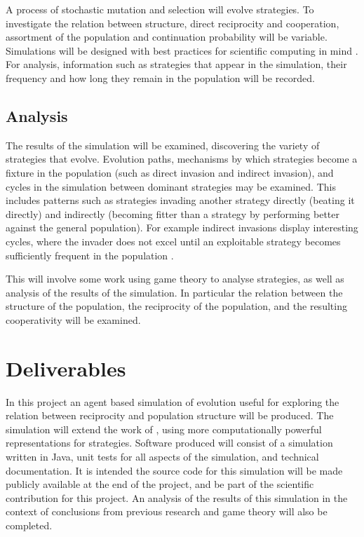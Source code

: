 \documentclass[a4paper,11pt]{article}
\begin{document}
A process of stochastic mutation and selection will evolve strategies. 
To investigate the relation between structure, direct reciprocity and cooperation, assortment of the population and continuation probability will be variable. 
Simulations will be designed with best practices for scientific computing in mind \citep{wilson2014best}. 
For analysis, information such as strategies that appear in the simulation, their frequency and how long they remain in the population will be recorded. %
\subsection{Analysis}
The results of the simulation will be examined, discovering the variety of strategies that evolve. 
Evolution paths, mechanisms by which strategies become a fixture in the population (such as direct invasion and indirect invasion), and cycles in the simulation between dominant strategies may be examined. 
This includes patterns such as strategies invading another strategy directly (beating it directly) and indirectly (becoming fitter than a strategy by performing better against the general population). 
For example indirect invasions display interesting cycles, where the invader does not excel until an exploitable strategy becomes sufficiently frequent in the population \citep{van-veelen:PNAS:2012}. 

This will involve some work using game theory to analyse strategies, as well as analysis of the results of the simulation. 
In particular the relation between the structure of the population, the reciprocity of the population, and the resulting cooperativity will be examined. 
\section{Deliverables}
In this project an agent based simulation of evolution useful for exploring the relation between reciprocity and population structure will be produced. 
The simulation will extend the work of \citet{van-veelen:PNAS:2012}, using more computationally powerful representations for strategies. 
Software produced will consist of a simulation written in Java, unit tests for all aspects of the simulation, and technical documentation. 
It is intended the source code for this simulation will be made publicly available at the end of the project, and be part of the scientific contribution for this project. 
An analysis of the results of this simulation in the context of conclusions from previous research and game theory will also be completed. 



\end{document}
